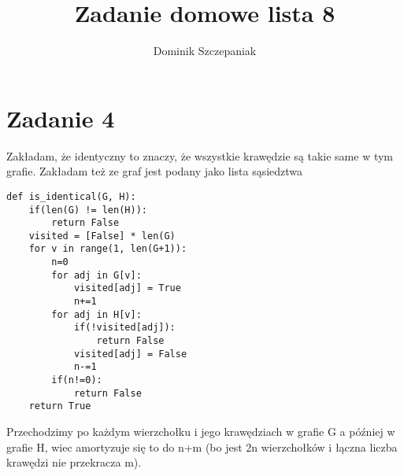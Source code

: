 \documentclass[12pt]{article}
\title{Zadanie domowe lista 8}
\author{Dominik Szczepaniak}
\begin{document}
\maketitle

\section{Zadanie 4}
Zakładam, że identyczny to znaczy, że wszystkie krawędzie są takie same w tym grafie.
Zakładam też ze graf jest podany jako lista sąsiedztwa
\begin{lstlisting}
def is_identical(G, H):
    if(len(G) != len(H)):
        return False
    visited = [False] * len(G)
    for v in range(1, len(G+1)):
        n=0
        for adj in G[v]:
            visited[adj] = True 
            n+=1
        for adj in H[v]:
            if(!visited[adj]):
                return False
            visited[adj] = False 
            n-=1
        if(n!=0):
            return False
    return True
\end{lstlisting}
Przechodzimy po każdym wierzchołku i jego krawędziach w grafie G a później w grafie H, wiec amortyzuje się to do n+m (bo jest 2n wierzchołków i łączna liczba krawędzi nie przekracza m).
\end{document}
